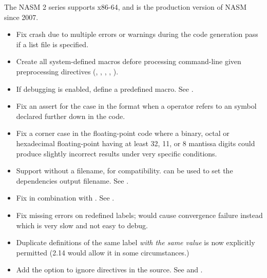 %
%


The NASM 2 series supports x86-64, and is the production version of NASM
since 2007.


\begin{itemize}
    \item{Fix crash due to multiple errors or warnings during the code
        generation pass if a list file is specified.}
\end{itemize}


\begin{itemize}
    \item{Create all system-defined macros defore processing command-line
        given preprocessing directives (, , , ,
        ).}

    \item{If debugging is enabled, define a  predefined
        macro. See .}

    \item{Fix an assert for the case in the  format when a 
        operator refers to an  symbol declared further down in the
        code.}

    \item{Fix a corner case in the floating-point code where a binary, octal
        or hexadecimal floating-point having at least 32, 11, or 8 mantissa
        digits could produce slightly incorrect results under very specific
        conditions.}

    \item{Support  without a filename, for  compatibility.
         can be used to set the dependencies output filename.
        See .}

    \item{Fix  in combination with . See .}

    \item{Fix missing errors on redefined labels; would cause convergence
        failure instead which is very slow and not easy to debug.}

    \item{Duplicate definitions of the same label \emph{with the same value} is now
        explicitly permitted (2.14 would allow it in some circumstances.)}

    \item{Add the option  to ignore  directives in the
        source. See  and .}
\end{itemize}

